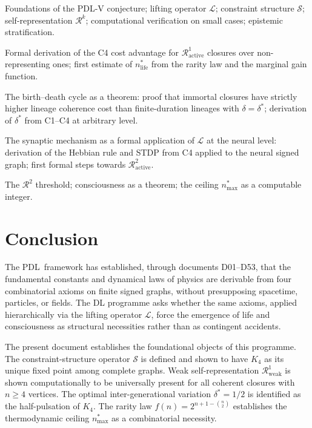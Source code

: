 \documentclass[12pt,a4paper]{article}
\theoremstyle{plain}
\theoremstyle{definition}
\theoremstyle{remark}
\newcommand{\PDL}{\textsc{PDL}}
\newcommand{\Kfour}{K_4}
\newcommand{\Sop}{\mathcal{S}}
\newcommand{\Rop}{\mathcal{R}}
\newcommand{\Lop}{\mathcal{L}}
\begin{document}
\begin{description}[leftmargin=2em]
\item[DL01 (this document)] Foundations of the \PDL-V conjecture; lifting operator
$\Lop$; constraint structure $\Sop$; self-representation $\Rop^k$; computational
verification on small cases; epistemic stratification.

\item[DL02] Formal derivation of the C4 cost advantage for $\Rop^1_{\mathrm{active}}$
closures over non-representing ones; first estimate of $n^{*}_{\mathrm{life}}$ from
the rarity law and the marginal gain function.

\item[DL03] The birth--death cycle as a theorem: proof that immortal closures have
strictly higher lineage coherence cost than finite-duration lineages with $\delta =
\delta^{*}$; derivation of $\delta^{*}$ from C1--C4 at arbitrary level.

\item[DL04] The synaptic mechanism as a formal application of $\Lop$ at the neural
level: derivation of the Hebbian rule and STDP from C4 applied to the neural signed
graph; first formal steps towards $\Rop^2_{\mathrm{active}}$.

\item[DL05 and beyond] The $\Rop^2$ threshold; consciousness as a theorem; the
ceiling $n^{*}_{\mathrm{max}}$ as a computable integer.
\end{description}

\section{Conclusion}
\label{sec:conclusion}

The \PDL\ framework has established, through documents D01--D53, that the fundamental
constants and dynamical laws of physics are derivable from four combinatorial axioms
on finite signed graphs, without presupposing spacetime, particles, or fields. The
DL programme asks whether the same axioms, applied hierarchically via the lifting
operator $\Lop$, force the emergence of life and consciousness as structural
necessities rather than as contingent accidents.

The present document establishes the foundational objects of this programme. The
constraint-structure operator $\Sop$ is defined and shown to have $\Kfour$ as its
unique fixed point among complete graphs. Weak self-representation
$\Rop^1_{\mathrm{weak}}$ is shown computationally to be universally present for all
coherent closures with $n \geq 4$ vertices. The optimal inter-generational variation
$\delta^{*} = 1/2$ is identified as the half-pulsation of $\Kfour$. The rarity law
$f(n) = 2^{n+1-\binom{n}{2}}$ establishes the thermodynamic ceiling $n^{*}_{\mathrm{max}}$
as a combinatorial necessity.
\end{document}
